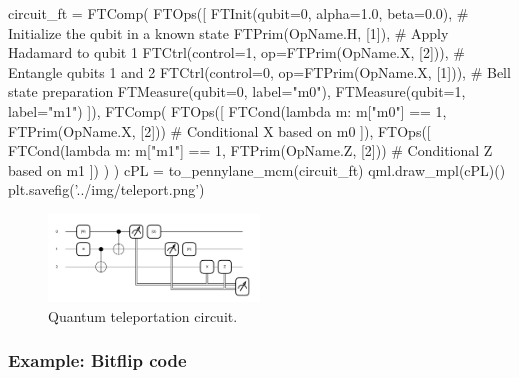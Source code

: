   \begin{python}
  circuit_ft = FTComp(
    FTOps([
      FTInit(qubit=0, alpha=1.0, beta=0.0),         # Initialize the qubit in a known state
      FTPrim(OpName.H, [1]),                        # Apply Hadamard to qubit 1
      FTCtrl(control=1, op=FTPrim(OpName.X, [2])),  # Entangle qubits 1 and 2
      FTCtrl(control=0, op=FTPrim(OpName.X, [1])),  # Bell state preparation
      FTMeasure(qubit=0, label="m0"),
      FTMeasure(qubit=1, label="m1")
    ]),
    FTComp(
      FTOps([
        FTCond(lambda m: m["m0"] == 1, FTPrim(OpName.X, [2]))  # Conditional X based on m0
      ]),
      FTOps([
        FTCond(lambda m: m["m1"] == 1, FTPrim(OpName.Z, [2]))  # Conditional Z based on m1
      ])
    )
  )
  cPL = to_pennylane_mcm(circuit_ft)
  qml.draw_mpl(cPL)()
  plt.savefig('../img/teleport.png')
  \end{python}

\begin{figure}[h!]
  \centering
  \includegraphics[width=0.5\textwidth]{../img/teleport.png}
  \caption{Quantum teleportation circuit.}
  \label{fig:teleport}
\end{figure}


\subsubsection{Example: Bitflip code}

